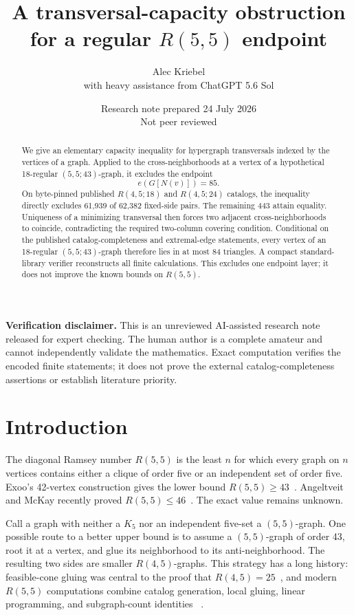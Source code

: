 \documentclass[11pt]{article}
\title{A transversal-capacity obstruction for a regular
\texorpdfstring{$R(5,5)$}{R(5,5)} endpoint}
\author{Alec Kriebel\\[2pt]\large with heavy assistance from ChatGPT 5.6 Sol}
\date{Research note prepared 24 July 2026\\Not peer reviewed}
\begin{document}
\maketitle

\begin{abstract}
We give an elementary capacity inequality for hypergraph transversals indexed
by the vertices of a graph.  Applied to the cross-neighborhoods at a vertex of
a hypothetical 18-regular $(5,5;43)$-graph, it excludes the endpoint
\[
 e(G[N(v)])=85.
\]
On byte-pinned published $R(4,5;18)$ and $R(4,5;24)$ catalogs, the inequality
directly excludes 61,939 of 62,382 fixed-side pairs.  The remaining 443 attain
equality.  Uniqueness of a minimizing transversal then forces two adjacent
cross-neighborhoods to coincide, contradicting the required two-column
covering condition.  Conditional on the published catalog-completeness and
extremal-edge statements, every vertex of an 18-regular $(5,5;43)$-graph
therefore lies in at most 84 triangles.  A compact standard-library verifier
reconstructs all finite calculations.  This excludes one endpoint layer; it
does not improve the known bounds on $R(5,5)$.
\end{abstract}

\noindent\textbf{Verification disclaimer.}
This is an unreviewed AI-assisted research note released for expert checking.
The human author is a complete amateur and cannot independently validate the
mathematics.  Exact computation verifies the encoded finite statements; it
does not prove the external catalog-completeness assertions or establish
literature priority.

\section{Introduction}

The diagonal Ramsey number $R(5,5)$ is the least $n$ for which every graph on
$n$ vertices contains either a clique of order five or an independent set of
order five.  Exoo's 42-vertex construction gives the lower bound
$R(5,5)\geq43$~\cite{exoo1989}.  Angeltveit and McKay recently proved
$R(5,5)\leq46$~\cite{angeltveit-mckay-46}.  The exact value remains unknown.

Call a graph with neither a $K_5$ nor an independent five-set a
$(5,5)$-graph.  One possible route to a better upper bound is to assume a
$(5,5)$-graph of order 43, root it at a vertex, and glue its neighborhood to
its anti-neighborhood.  The resulting two sides are smaller $R(4,5)$-graphs.
This strategy has a long history: feasible-cone gluing was central to the
proof that $R(4,5)=25$~\cite{mckay-radziszowski-r45}, and modern
$R(5,5)$ computations combine catalog generation, local gluing, linear
programming, and subgraph-count identities
~\cite{mckay-radziszowski-lp,mckay-radziszowski-counting,
angeltveit-mckay-48,angeltveit-mckay-46}.
\end{document}
